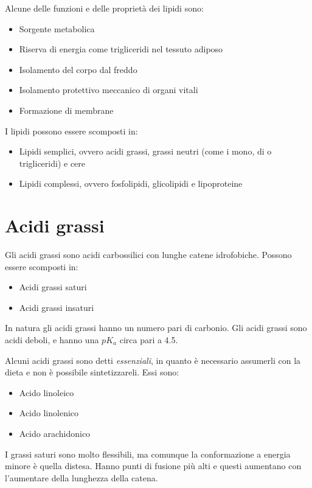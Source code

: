 Alcune delle funzioni e delle proprietà dei lipidi sono:
\begin{itemize}
\item Sorgente metabolica
\item Riserva di energia come trigliceridi nel tessuto adiposo
\item Isolamento del corpo dal freddo
\item Isolamento protettivo meccanico di organi vitali
\item Formazione di membrane
\end{itemize}

I lipidi possono essere scomposti in:
\begin{itemize}
\item Lipidi semplici, ovvero acidi grassi, grassi neutri (come i mono, di o trigliceridi) e cere
\item Lipidi complessi, ovvero fosfolipidi, glicolipidi e lipoproteine
\end{itemize}


\clearpage

\section{Acidi grassi}

Gli acidi grassi sono acidi carbossilici con lunghe catene idrofobiche. Possono essere scomposti in:
\begin{itemize}
\item Acidi grassi saturi
\item Acidi grassi insaturi
\end{itemize}

In natura gli acidi grassi hanno un numero pari di carbonio. 
Gli acidi grassi sono acidi deboli, e hanno una $pK_a$ circa pari a 4.5.

Alcuni acidi grassi sono detti \emph{essenziali}, in quanto è necessario assumerli con la dieta e non è possibile sintetizzareli. Essi sono:
\begin{itemize}
\item Acido linoleico
\item Acido linolenico
\item Acido arachidonico
\end{itemize}

I grassi saturi sono molto flessibili, ma comunque la conformazione a energia minore è quella distesa. Hanno punti di fusione più alti e questi aumentano con l'aumentare della lunghezza della catena.

